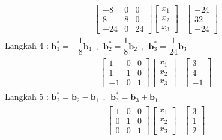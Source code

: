	\begin{align*}
		\begin{array}{r|r} 
			\left[
			\begin{array}{rrr} 
				-8 & 0 & 0\\
				8 & 8 & 0\\
				-24 &0 & 24 
			\end{array} 
			\right] 
			\left[
			\begin{array}{r} 
				x_1 \\ 
				x_2 \\
				x_3
			\end{array}
			\right]  & \left[
			\begin{array}{r} 
				-24\\
				32\\
				-24 
			\end{array} 
			\right]
		\end{array}
	\end{align*}
	Langkah 4 : $\textbf{b}^*_1= -\dfrac{1}{8}\textbf{b}_1~~,~~\textbf{b}^*_2= \dfrac{1}{8}\textbf{b}_2~~,~~\textbf{b}^*_3= \dfrac{1}{24}\textbf{b}_3$ \\
	\begin{align*}
		\begin{array}{r|r} 
			\left[
			\begin{array}{rrr} 
				1 & 0 & 0\\
				1 & 1 & 0\\
				-1 &0 & 1 
			\end{array} 
			\right]\left[
			\begin{array}{r} 
				x_1 \\ 
				x_2 \\
				x_3
			\end{array}
			\right]  & \left[
			\begin{array}{r} 
				3\\
				4\\
				-1 
			\end{array} 
			\right]
		\end{array}
	\end{align*}
	Langkah 5 : $\textbf{b}^*_2= \textbf{b}_2 - \textbf{b}_1~~,~~\textbf{b}^*_3= \textbf{b}_3 + \textbf{b}_1$ \\
	\begin{align*}
		\begin{array}{r|r} 
			\left[
			\begin{array}{rrr} 
				1 & 0 & 0\\
				0 & 1 & 0\\
				0 &0 & 1 
			\end{array} 
			\right] \left[
			\begin{array}{r} 
				x_1 \\ 
				x_2 \\
				x_3
			\end{array}
			\right] & \left[
			\begin{array}{r} 
				3\\
				1\\
				2 
			\end{array} 
			\right]
		\end{array}
	\end{align*}
